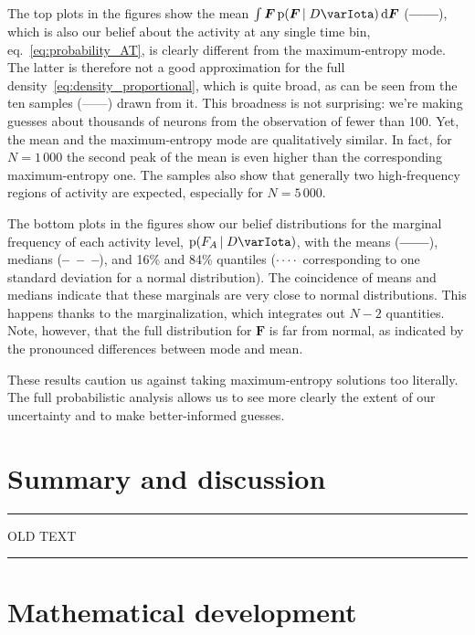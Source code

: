 \documentclass[\ifafour a4paper,12pt,\else a5paper,10pt,\fi%
onecolumn,oneside,article,%
british%
]{memoir}
\theoremstyle{remark}
\theoremstyle{innote}
\newcommand*{\di}{\mathrm{d}}%
\newcommand*{\pf}{\mathrm{p}}%
\renewcommand*{\|}[1][]{\nonscript\,#1\vert\nonscript\;\mathopen{}}
\newcommand*{\eqn}{eq.}%
\newcommand*{\yAv}{A}
\newcommand*{\yFF}{F}
\newcommand*{\yF}{\bm{\yFF}}
\newcommand*{\yA}{\yAv}%
\newcommand*{\yI}{\varIota}
\newcommand*{\yD}{D}
\begin{document}
The top plots in the figures show the mean
$\int \yF\, \pf(\yF \| \yD \yI)\,\di\yF$
(\textcolor{mypurpleblue}{\textbf{------}}), which is also our belief about the
activity at any single time bin, \eqn~\eqref{eq:probability_AT}, is clearly
different from the maximum-entropy mode. The latter is therefore not a good
approximation for the full density~\eqref{eq:density_proportional}, which
is quite broad, as can be seen from the ten samples
(\textcolor{mygreen}{------}) drawn from it. This broadness is not
surprising: we're making guesses about thousands of neurons from the
observation of fewer than 100. Yet, the mean and the maximum-entropy mode
are qualitatively similar. In fact, for $N=1\,000$ the second peak of the
mean is even higher than the corresponding maximum-entropy one. The samples
also show that generally two high-frequency regions of activity are
expected, especially for $N=5\,000$.

The bottom plots in the figures show our belief distributions for the
marginal frequency of each activity level, $\pf(\yFF_{\yA} \| \yD \yI)$,
with the means (\textcolor{mypurpleblue}{\textbf{------}}), medians
(\textcolor{mygreen}{\textbf{--~--~--}}), and 16\% and 84\% quantiles
(\textcolor{myyellow}{$\bm{\cdot \cdot \cdot \cdot}$} corresponding to one
standard deviation for a normal distribution). The coincidence of means
and medians indicate that these marginals are very close to normal
distributions. This happens thanks to the marginalization, which integrates
out $N-2$ quantities. Note, however, that the full distribution for $\yF$
is far from normal, as indicated by the pronounced differences between mode
and mean.

\bigskip

These results caution us against taking maximum-entropy solutions too
literally. The full probabilistic analysis allows us to see more clearly
the extent of our uncertainty and to make better-informed guesses.





\section{Summary and discussion}
\label{sec:summary_discussion}


\clearpage
\hrule
OLD TEXT
\hrule

\section{Mathematical development}
\label{sec:maths_development}
\end{document}
